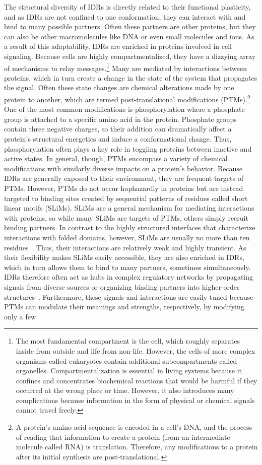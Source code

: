 The structural diversity of IDRs is directly related to their functional plasticity, and as IDRs are not confined to one conformation, they can interact with and bind to many possible partners. Often these partners are other proteins, but they can also be other macromolecules like DNA or even small molecules and ions. As a result of this adaptability, IDRs are enriched in proteins involved in cell signaling. Because cells are highly compartmentalized, they have a dizzying array of mechanisms to relay messages.\footnote{The most fundamental compartment is the cell, which roughly separates inside from outside and life from non-life. However, the cells of more complex organisms called eukaryotes contain additional subcompartments called organelles. Compartmentalization is essential in living systems because it confines and concentrates biochemical reactions that would be harmful if they occurred at the wrong place or time. However, it also introduces many complications because information in the form of physical or chemical signals cannot travel freely.} Many are mediated by interactions between proteins, which in turn create a change in the state of the system that propagates the signal. Often these state changes are chemical alterations made by one protein to another, which are termed post-translational modifications (PTMs).\footnote{A protein's amino acid sequence is encoded in a cell's DNA, and the process of reading that information to create a protein (from an intermediate molecule called RNA) is translation. Therefore, any modifications to a protein after its initial synthesis are post-translational.} One of the most common modifications is phosphorylation where a phosphate group is attached to a specific amino acid in the protein. Phosphate groups contain three negative charges, so their addition can dramatically affect a protein's structural energetics and induce a conformational change. Thus, phosphorylation often plays a key role in toggling proteins between inactive and active states. In general, though, PTMs encompass a variety of chemical modifications with similarly diverse impacts on a protein's behavior. Because IDRs are generally exposed to their environment, they are frequent targets of PTMs. However, PTMs do not occur haphazardly in proteins but are instead targeted to binding sites created by sequential patterns of residues called short linear motifs (SLiMs). SLiMs are a general mechanism for mediating interactions with proteins, so while many SLiMs are targets of PTMs, others simply recruit binding partners. In contrast to the highly structured interfaces that characterize interactions with folded domains, however, SLiMs are usually no more than ten residues~\cite{Tompa2014}. Thus, their interactions are relatively weak and highly transient. As their flexibility makes SLiMs easily accessible, they are also enriched in IDRs, which in turn allows them to bind to many partners, sometimes simultaneously. IDRs therefore often act as hubs in complex regulatory networks by propagating signals from diverse sources or organizing binding partners into higher-order structures~\cite{Dunker2005, Wright2014}. Furthermore, these signals and interactions are easily tuned because PTMs can modulate their meanings and strengths, respectively, by modifying only a few 